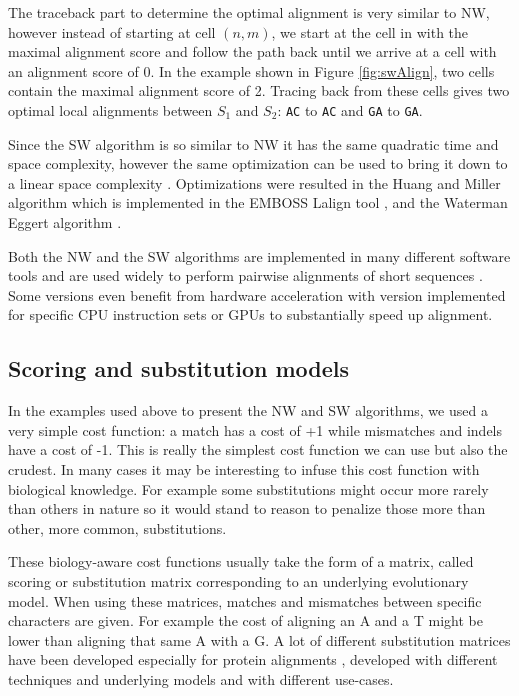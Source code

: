 \documentclass[
  11pt,
  twoside,
  BCOR=10mm,
  listof=totoc]{scrbook}
\begin{document}
The traceback part to determine the optimal alignment is very similar to NW, however instead of starting at cell \((n,m)\), we start at the cell in with the maximal alignment score and follow the path back until we arrive at a cell with an alignment score of 0. In the example shown in Figure \ref{fig:swAlign}, two cells contain the maximal alignment score of 2. Tracing back from these cells gives two optimal local alignments between \(S_1\) and \(S_2\): \texttt{AC} to \texttt{AC} and \texttt{GA} to \texttt{GA}.

Since the SW algorithm is so similar to NW it has the same quadratic time and space complexity, however the same optimization can be used to bring it down to a linear space complexity \autocite{sungAlgorithmsBioinformaticsPractical2011}. Optimizations were resulted in the Huang and Miller algorithm \autocite{huangTimeefficientLinearspaceLocal1991} which is implemented in the EMBOSS Lalign tool \autocite{riceEMBOSSEuropeanMolecular2000}, and the Waterman Eggert algorithm \autocite{watermanNewAlgorithmBest1987}.

Both the NW and the SW algorithms are implemented in many different software tools and are used widely to perform pairwise alignments of short sequences \autocite{stajichBioperlToolkitPerl2002,gentlemanBioconductorOpenSoftware2004,riceEMBOSSEuropeanMolecular2000}. Some versions even benefit from hardware acceleration with version implemented for specific CPU instruction sets \autocite{dailyParasailSIMDLibrary2016} or GPUs \autocite{frohmbergGPASImprovedVersion2012} to substantially speed up alignment.

\hypertarget{scoring-and-substitution-models}{%
\subsection{Scoring and substitution models}\label{scoring-and-substitution-models}}

In the examples used above to present the NW and SW algorithms, we used a very simple cost function: a match has a cost of +1 while mismatches and indels have a cost of -1. This is really the simplest cost function we can use but also the crudest. In many cases it may be interesting to infuse this cost function with biological knowledge. For example some substitutions might occur more rarely than others in nature so it would stand to reason to penalize those more than other, more common, substitutions.

These biology-aware cost functions usually take the form of a matrix, called scoring or substitution matrix corresponding to an underlying evolutionary model. When using these matrices, matches and mismatches between specific characters are given. For example the cost of aligning an A and a T might be lower than aligning that same A with a G. A lot of different substitution matrices have been developed especially for protein alignments \autocite{altschulSubstitutionMatrices2013}, developed with different techniques and underlying models and with different use-cases.
\end{document}
